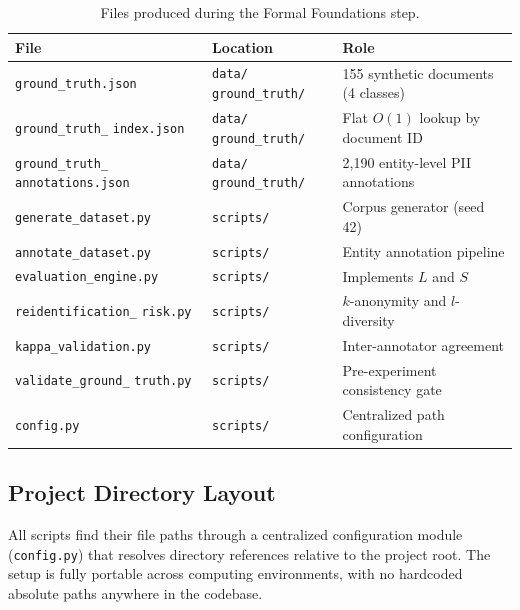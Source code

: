 \documentclass[12pt, a4paper]{report}
\begin{document}
\begin{table}[H]
\centering
\caption{Files produced during the Formal Foundations step.}
\label{tab:deliverables}
\scriptsize
\setlength{\tabcolsep}{3pt}
\begin{tabular}{L{3.3cm} L{2.2cm} L{6.6cm}}
\toprule
{}
\color{white}\textbf{File} &
\color{white}\textbf{Location} &
\color{white}\textbf{Role} \\
\midrule
\texttt{ground\_truth.json}           & \texttt{data/} \texttt{ground\_truth/} & 155 synthetic documents (4 classes) \\
\texttt{ground\_truth\_} \texttt{index.json} & \texttt{data/} \texttt{ground\_truth/} & Flat $O(1)$ lookup by document ID \\
\texttt{ground\_truth\_} \texttt{annotations.json} & \texttt{data/} \texttt{ground\_truth/} & 2{,}190 entity-level PII annotations \\
\texttt{generate\_dataset.py}         & \texttt{scripts/}  & Corpus generator (seed 42) \\
\texttt{annotate\_dataset.py}         & \texttt{scripts/}  & Entity annotation pipeline \\
\texttt{evaluation\_engine.py}        & \texttt{scripts/}  & Implements $L$ and $S$ \\
\texttt{reidentification\_} \texttt{risk.py} & \texttt{scripts/}  & $k$-anonymity and $l$-diversity \\
\texttt{kappa\_validation.py}         & \texttt{scripts/}  & Inter-annotator agreement \\
\texttt{validate\_ground\_} \texttt{truth.py} & \texttt{scripts/}  & Pre-experiment consistency gate \\
\texttt{config.py}                         & \texttt{scripts/}           & Centralized path configuration \\
\bottomrule
\end{tabular}
\setlength{\tabcolsep}{6pt}
\end{table}

\subsection{Project Directory Layout}

All scripts find their file paths through a centralized configuration module (\texttt{config.py}) that resolves directory references relative to the project root. The setup is fully portable across computing environments, with no hardcoded absolute paths anywhere in the codebase.
\end{document}
